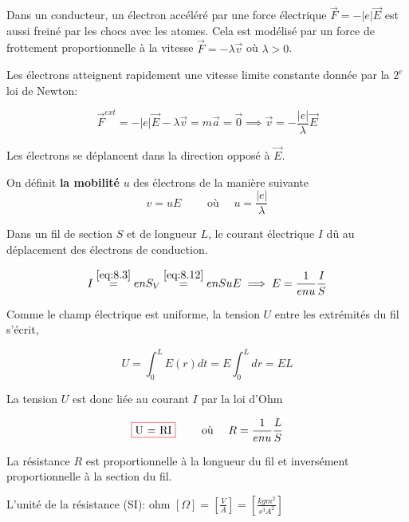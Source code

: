 \documentclass[
    11pt,
    a4paper,
    oneside,
    headinlcude, footinclude,
    twoside,
]{report}
\renewcommand{\vec}[1]{\overrightarrow{#1}}
\newcommand{\cfbox}[2]{
    \colorlet{currentcolor}{.}
    {\color{#1}
    \fbox{\color{currentcolor}#2}}
}
\begin{document}
Dans un conducteur, un électron accéléré par une force électrique $\vec F = -
|e| \vec E$ est aussi freiné par les chocs avec les atomes. Cela est modélisé
par un force de frottement proportionnelle à la vitesse $\vec F = -\lambda \vec v$
où $\lambda > 0$.

Les électrons atteignent rapidement une vitesse limite constante donnée par la
$2^e$ loi de Newton:

\begin{equation}
    \label{eq:8.11}
    \vec F^{ext} = - |e| \vec E - \lambda \vec v = m \vec a = \vec 0 \implies
    \vec v = - \frac{|e|}{\lambda} \vec E
\end{equation}

Les électrons se déplancent dans la direction opposé à $\vec E$.

On définit \textbf{ la mobilité } $u$ des électrons de la manière suivante \begin{equation}
    \label{eq:8.12}
    v = u E \quad \quad \text{ où } \quad u = \frac{|e|}{\lambda}
\end{equation}



Dans un fil de section $S$ et de longueur $L$, le courant électrique $I$ d\^u
au déplacement des électrons de conduction.

\begin{equation}
    \label{eq:8.13}
    I \stackrel{\eqref{eq:8.3}}{=} en S_V \stackrel{\eqref{eq:8.12}}{=} enSuE
    \implies E = \frac{1}{enu} \frac{I}{S}
\end{equation}

Comme le champ électrique est uniforme, la tension $U$ entre les extrémités du
fil s'écrit,

\begin{equation}
    \label{eq:8.14}
    U = \int_0^L E(r) dt = E \int_0^Ldr = EL
\end{equation}

La tension $U$ est donc liée au courant $I$ par la loi  d'Ohm

\begin{equation}
    \label{eq:8.15}
    \cfbox{red}{U = RI} \quad \quad \text{ où } \quad R = \frac{1}{enu} \frac{L}{S} 
\end{equation}

 
La résistance $R$ est proportionnelle à la longueur du fil et inversément
proportionnelle à la section du fil.

L'unité de la résistance (SI): ohm $[\Omega] = \left[\frac{V}{A}\right] = \left[\frac{kgm^2}{s^3A^2}\right]$
\end{document}
